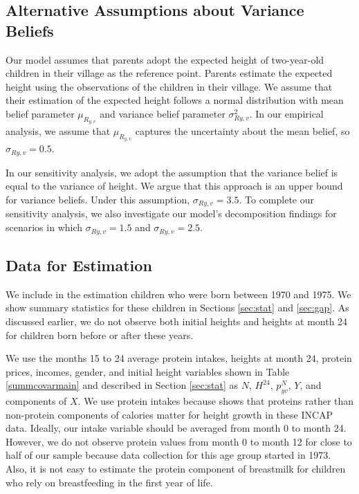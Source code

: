 \clearpage
\pagebreak

\subsection{Alternative Assumptions about Variance Beliefs} \label{sec:appsecalter}

Our model assumes that parents adopt the expected height of two-year-old children in their village as the reference point. Parents estimate the expected height using the observations of the children in their village. We assume that their estimation of the expected height follows a normal distribution with mean belief parameter $\mu_{R_{y,v}}$ and variance belief parameter $\sigma_{R{y,v}}^{2}$. In our empirical analysis, we assume that $\mu_{R_{y,v}}$  captures the uncertainty about the mean belief, so  $\sigma_{R{y,v}} = 0.5$.

In our sensitivity analysis, we adopt the assumption that the variance belief is equal to the variance of height. We argue that this approach is an upper bound for variance beliefs. Under this assumption, $\sigma_{R{y,v}} = 3.5$. To complete our sensitivity analysis, we also investigate our model's decomposition findings for scenarios in which $\sigma_{R{y,v}} = 1.5$ and $\sigma_{R{y,v}} = 2.5$.

\subsection{Data for Estimation \label{sec:estidata}}

We include in the estimation children who were born between 1970 and 1975. We show summary statistics for these children in Sections \ref{sec:stat} and \ref{sec:gap}. As discussed earlier, we do not observe both initial heights and heights at month 24 for children born before or after these years.

We use the months 15 to 24 average protein intakes, heights at month 24, protein prices, incomes, gender, and initial height variables shown in Table \ref{summcovarmain} and described in Section \ref{sec:stat} as $N$, $H^{24}$, $p_{yv}^{N}$, $Y$, and components of $X$. We use protein intakes because \textcite{puentes_early_2016} shows that proteins rather than non-protein components of calories matter for height growth in these INCAP data. Ideally, our intake variable should be averaged from month 0 to month 24. However, we do not observe protein values from month 0 to month 12 for close to half of our sample because data collection for this age group started in 1973. Also, it is not easy to estimate the protein component of breastmilk for children who rely on breastfeeding in the first year of life.

